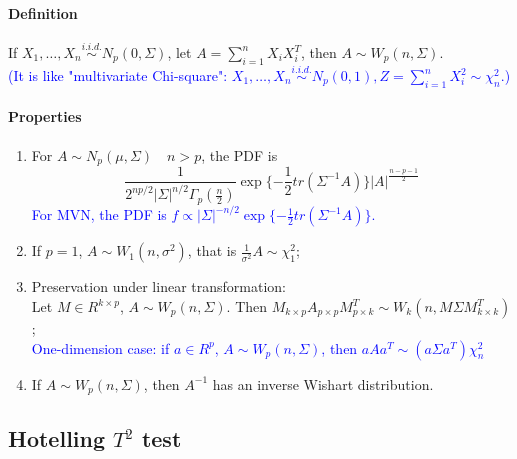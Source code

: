 \documentclass[12pt]{book}
\theoremstyle{definition}
\theoremstyle{remark}
\begin{document}
\paragraph{Definition} If $X_1, \dots, X_n \overset{i.i.d.}{\sim} N_p(0, \Sigma)$, let $A = \sum_{i=1}^n X_iX_i^T$, then $A \sim W_p(n, \Sigma)$.\\
\textcolor{blue}{(It is like "multivariate Chi-square": $X_1, \dots, X_n \overset{i.i.d.}{\sim} N_p(0, 1), Z = \sum_{i=1}^nX_i^2\sim\chi^2_n$.)}

\paragraph{Properties}
\begin{enumerate}
    \item For $A\sim N_p(\mu, \Sigma)\quad n>p$, the PDF is 
    \[\frac{1}{2^{np/2}|\Sigma|^{n/2}\Gamma_p(\frac{n}{2})}\exp\{-\frac{1}{2}tr(\Sigma^{-1}A)\}|A|^{\frac{n-p-1}{2}}\]
    \textcolor{blue}{
    For MVN, the PDF is $f \propto |\Sigma|^{-n/2}\exp\{-\frac{1}{2}tr(\Sigma^{-1}A)\}$.
    }
    \item If $p=1$, $A\sim W_1(n, \sigma^2)$, that is $\frac{1}{\sigma^2}A\sim \chi^2_{1}$;
    \item Preservation under linear transformation:\\
    Let $M \in R^{k\times p}$, $A \sim W_p(n,\Sigma)$. Then $M_{k\times p}A_{p\times p}M_{p\times k}^T\sim W_k(n, M\Sigma M^T_{k\times k})$;\\
    \textcolor{blue}{One-dimension case: if $a\in R^p$, $A \sim W_p(n,\Sigma)$, then $aAa^T \sim (a\Sigma a^T)\chi^2_n$}
    \item If $A \sim W_p(n, \Sigma)$, then $A^{-1}$ has an inverse Wishart distribution.
\end{enumerate}


\subsection{Hotelling $T^2$ test}
\end{document}
